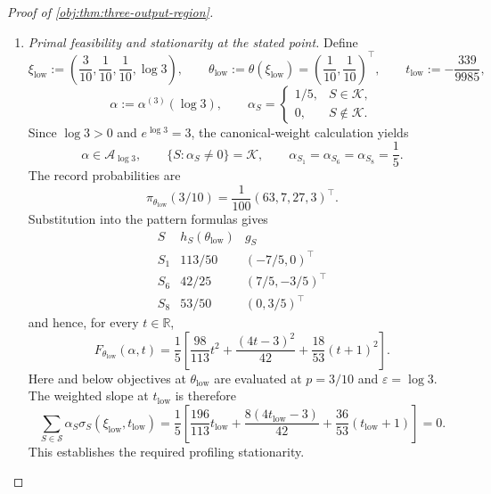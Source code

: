 \documentclass[11pt]{article}
\begin{document}
\begin{proof}[Proof of \cref{obj:thm:three-output-region}]
\begin{enumerate}
\item \textit{Primal feasibility and stationarity at the stated point.}
Define
\[
\xi_{\mathrm{low}}
:=
\left(\frac3{10},\frac1{10},\frac1{10},\log3\right),
\qquad
\theta_{\mathrm{low}}:=\theta(\xi_{\mathrm{low}})
=\left(\frac1{10},\frac1{10}\right)^\top,
\qquad
t_{\mathrm{low}}:=-\frac{339}{9985},
\]
\[
\alpha:=\alpha^{(3)}(\log3),
\qquad
\alpha_S=
\begin{cases}
1/5,&S\in\mathcal K,\\
0,&S\notin\mathcal K.
\end{cases}
\]
Since \(\log3>0\) and \(e^{\log3}=3\), the canonical-weight calculation yields
\[
\alpha\in\mathcal A_{\log3},
\qquad
\{S:\alpha_S\ne0\}=\mathcal K,
\qquad
\alpha_{S_1}=\alpha_{S_6}=\alpha_{S_8}=\frac15.
\]
The record probabilities are
\[
\pi_{\theta_{\mathrm{low}}}(3/10)
=\frac1{100}(63,7,27,3)^\top.
\]
Substitution into the pattern formulas gives
\[
\begin{array}{c|c|c}
S&h_S(\theta_{\mathrm{low}})&g_S\\ \hline
S_1&113/50&(-7/5,0)^\top\\
S_6&42/25&(7/5,-3/5)^\top\\
S_8&53/50&(0,3/5)^\top
\end{array}
\]
and hence, for every \(t\in\mathbb R\),
\[
F_{\theta_{\mathrm{low}}}(\alpha,t)
=
\frac15\left[
\frac{98}{113}t^2
+\frac{(4t-3)^2}{42}
+\frac{18}{53}(t+1)^2
\right].
\]
Here and below objectives at \(\theta_{\mathrm{low}}\) are evaluated at \(p=3/10\) and \(\varepsilon=\log3\). The weighted slope at \(t_{\mathrm{low}}\) is therefore
\[
\sum_{S\in\mathcal S}\alpha_S
\sigma_S(\xi_{\mathrm{low}},t_{\mathrm{low}})
=
\frac15\left[
\frac{196}{113}t_{\mathrm{low}}
+\frac{8(4t_{\mathrm{low}}-3)}{42}
+\frac{36}{53}(t_{\mathrm{low}}+1)
\right]
=0.
\]
This establishes the required profiling stationarity.


\end{enumerate}
\end{proof}
\end{document}
